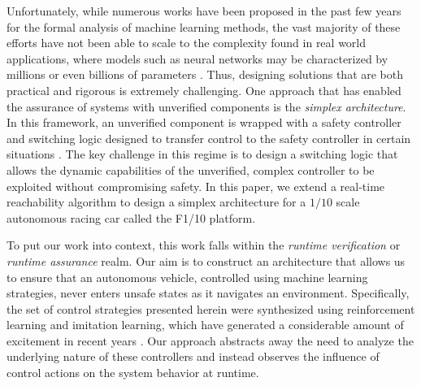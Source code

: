\documentclass[manuscript,screen,review]{acmart}
\newcommand{\todo}[1]{\textcolor{red}{\textbf{\underline{TODO:}} #1}}
\newcommand{\diego}[1]{\textcolor{purple}{\textbf{\underline{DM:}} #1}}
\begin{document}
Unfortunately, while numerous works have been proposed in the past few years for the formal analysis of machine learning methods, the vast majority of these efforts have not been able to scale to the complexity found in real world applications, where models such as neural networks may be characterized by millions or even billions of parameters \cite{SimonyanVeryDeep}. Thus, designing solutions that are both practical and rigorous is extremely challenging. One approach that has enabled the assurance of systems with unverified components is the \textit{simplex architecture}. In this framework, an unverified component is wrapped with a safety controller and switching logic designed to transfer control to the safety controller in certain situations \cite{Bak2014}. The key challenge in this regime is to design a switching logic that allows the dynamic capabilities of the unverified, complex controller to be exploited without compromising safety. In this paper, we extend a real-time reachability algorithm \cite{Bak2014,Johnson2016} to design a simplex architecture for a $1/10$ scale autonomous racing car called the F1/10 platform. %

To put our work into context, this work falls within the \textit{runtime verification} or \textit{runtime assurance} realm. Our aim is to construct an architecture that allows us to ensure that an autonomous vehicle, controlled using machine learning strategies, never enters unsafe states as it navigates an environment. Specifically, the set of control strategies presented herein were synthesized using reinforcement learning and imitation learning, which have generated a considerable amount of excitement in recent years \cite{bojarski2016end,lillicrap2015continuous}. Our approach abstracts away the need to analyze the underlying nature of these controllers and instead observes the influence of control actions on the system behavior at runtime. %
\end{document}
